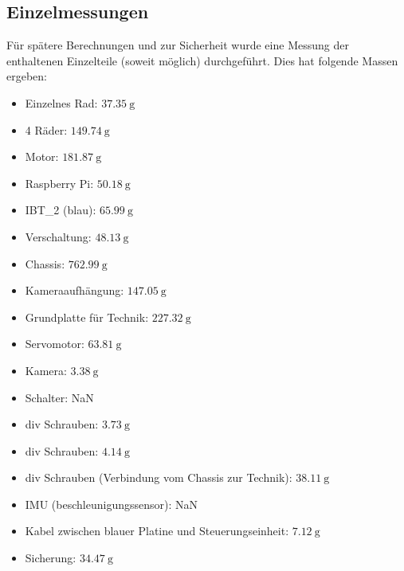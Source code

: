 \documentclass[11pt]{article}
\begin{document}
    \subsection{Einzelmessungen}
    Für spätere Berechnungen und zur Sicherheit wurde eine Messung der enthaltenen Einzelteile (soweit möglich) durchgeführt. Dies hat folgende Massen ergeben:
    \begin{multicols}{2}
    \begin{itemize}
        \item Einzelnes Rad: $\SI{37,35}{\gram}$
        \item 4 Räder: $\SI{149,74}{\gram}$
        \item Motor: $\SI{181,87}{\gram}$
        \item Raspberry Pi: $\SI{50,18}{\gram}$
        \item IBT\_2 (blau): $\SI{65,99}{\gram}$
        \item Verschaltung: $\SI{48,13}{\gram}$
        \item Chassis: $\SI{762,99}{\gram}$
        \item Kameraaufhängung: $\SI{147,05}{\gram}$
        \item Grundplatte für Technik: $\SI{227,32}{\gram}$
        \item Servomotor: $\SI{63,81}{\gram}$
        \item Kamera: $\SI{3,38}{\gram}$
        \item Schalter: NaN
        \item div Schrauben: $\SI{3,73}{\gram}$
        \item div Schrauben: $\SI{4,14}{\gram}$
        \item div Schrauben (Verbindung vom Chassis zur Technik): $\SI{38,11}{\gram}$
        \item IMU (beschleunigungssensor): NaN
        \item Kabel zwischen blauer Platine und Steuerungseinheit: $\SI{7,12}{\gram}$
        \item Sicherung: $\SI{34,47}{\gram}$
    \end{itemize}
    \end{multicols}
\end{document}
